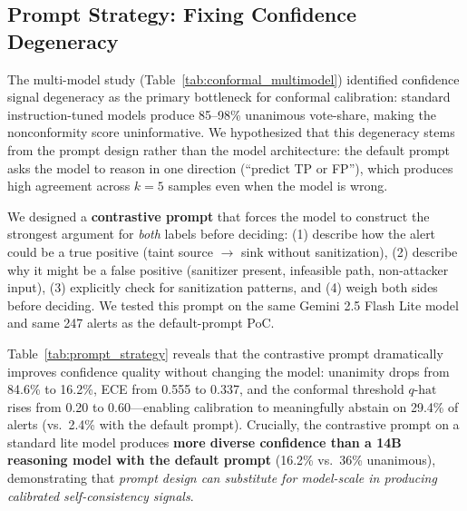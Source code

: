 \subsection{Prompt Strategy: Fixing Confidence Degeneracy}
\label{sec:prompt_strategy}

The multi-model study (Table~\ref{tab:conformal_multimodel}) identified confidence signal degeneracy as the primary bottleneck for conformal calibration: standard instruction-tuned models produce 85--98\% unanimous vote-share, making the nonconformity score uninformative. We hypothesized that this degeneracy stems from the prompt design rather than the model architecture: the default prompt asks the model to reason in one direction (``predict TP or FP''), which produces high agreement across $k=5$ samples even when the model is wrong.

We designed a \textbf{contrastive prompt} that forces the model to construct the strongest argument for \emph{both} labels before deciding: (1) describe how the alert could be a true positive (taint source $\to$ sink without sanitization), (2) describe why it might be a false positive (sanitizer present, infeasible path, non-attacker input), (3) explicitly check for sanitization patterns, and (4) weigh both sides before deciding. We tested this prompt on the same Gemini 2.5 Flash Lite model and same 247 alerts as the default-prompt PoC.

\begin{table}[t]
\centering
\caption{Prompt strategy comparison on Gemini 2.5 Flash Lite ($k{=}5$, 247 Juliet alerts, 5-fold CV, $\alpha{=}0.1$). The contrastive prompt reduces ECE by 39\% and unanimity by 68pp without changing the model, enabling meaningful conformal abstention.}
\label{tab:prompt_strategy}
\small
\setlength{\tabcolsep}{3.5pt}
\end{table}

Table~\ref{tab:prompt_strategy} reveals that the contrastive prompt dramatically improves confidence quality without changing the model: unanimity drops from 84.6\% to 16.2\%, ECE from 0.555 to 0.337, and the conformal threshold $q\text{-hat}$ rises from 0.20 to 0.60---enabling calibration to meaningfully abstain on 29.4\% of alerts (vs.\ 2.4\% with the default prompt). Crucially, the contrastive prompt on a standard lite model produces \textbf{more diverse confidence than a 14B reasoning model with the default prompt} (16.2\% vs.\ 36\% unanimous), demonstrating that \emph{prompt design can substitute for model-scale in producing calibrated self-consistency signals}.

